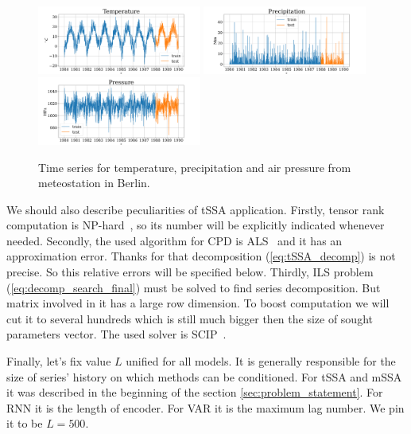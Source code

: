 	\begin{figure}[h]
		\centering
		\includegraphics[width=0.48\textwidth, keepaspectratio]{../../figs/Temperature.png}
		\includegraphics[width=0.48\textwidth, keepaspectratio]{../../figs/Precipitation.png}
		\includegraphics[width=0.48\textwidth, keepaspectratio]{../../figs/Pressure.png}
		\caption{Time series for temperature, precipitation and air pressure from meteostation in Berlin.}\label{fig:weather_data}
	\end{figure}
	
	We should also describe peculiarities of tSSA application. Firstly, tensor rank computation is NP-hard~\cite{HASTAD1990644}, so its number will be explicitly indicated whenever needed. Secondly, the used algorithm for CPD is ALS~\cite{kolda_tensors} and it has an approximation error. Thanks for that decomposition (\ref{eq:tSSA_decomp}) is not precise. So this relative errors will be specified below. Thirdly, ILS problem (\ref{eq:decomp_search_final}) must be solved to find series decomposition. But matrix involved in it has a large row dimension. To boost computation we will cut it to several hundreds which is still much bigger then the size of sought parameters vector. The used solver is SCIP~\cite{BolusaniEtal2024ZR}.

	Finally, let's fix value $ L $ unified for all models. It is generally responsible for the size of series' history on which methods can be conditioned. For tSSA and mSSA it was described in the beginning of the section \ref{sec:problem_statement}. For RNN it is the length of encoder. For VAR it is the maximum lag number. We pin it to be $ L = 500 $.
	
